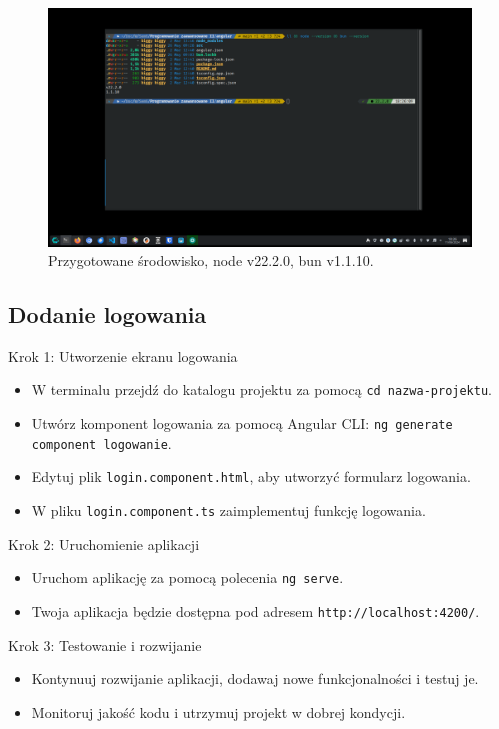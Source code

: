 \documentclass[12pt]{article}
\begin{document}
\begin{figure}[H]
  \centering
  \includegraphics[width=1\textwidth]{image-2.png}
  \caption{Przygotowane środowisko, node v22.2.0, bun v1.1.10.}
  \label{fig:image-2}
\end{figure}

\subsection{Dodanie logowania}
\begin{description}[leftmargin=.5em]
  \item Krok 1: Utworzenie ekranu logowania
  \item{\begin{itemize}
          \item W terminalu przejdź do katalogu projektu za pomocą \texttt{cd nazwa-projektu}.
          \item Utwórz komponent logowania za pomocą Angular CLI: \texttt{ng generate component logowanie}.
          \item Edytuj plik \texttt{login.component.html}, aby utworzyć formularz logowania.
          \item W pliku \texttt{login.component.ts} zaimplementuj funkcję logowania.
        \end{itemize}}
  \item Krok 2: Uruchomienie aplikacji
  \item{\begin{itemize}
          \item Uruchom aplikację za pomocą polecenia \texttt{ng serve}.
          \item Twoja aplikacja będzie dostępna pod adresem \texttt{http://localhost:4200/}.
        \end{itemize}}
  \item Krok 3: Testowanie i rozwijanie
  \item{\begin{itemize}
          \item Kontynuuj rozwijanie aplikacji, dodawaj nowe funkcjonalności i testuj je.
          \item Monitoruj jakość kodu i utrzymuj projekt w dobrej kondycji.
        \end{itemize}}
\end{description}
\end{document}
